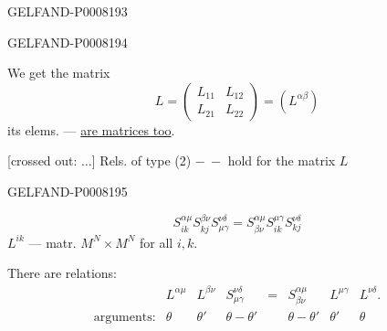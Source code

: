 \begin{GelfandAdjacentEvidence}{GELFAND-P000819}{3}


\end{GelfandAdjacentEvidence}
\begin{GelfandAdjacentEvidence}{GELFAND-P000819}{4}


We get the matrix
\begin{equation*}
L=\begin{pmatrix}L_{11}&L_{12}\\L_{21}&L_{22}\end{pmatrix}
=(L^{\alpha\beta})\tag{19}
\end{equation*}
its elems. — \uline{are matrices too}.

[crossed out: \sout{\(\ldots\)}]
Rels. of type (2) \(-\ -\) hold for the matrix \(L\)
\end{GelfandAdjacentEvidence}
\begin{GelfandAdjacentEvidence}{GELFAND-P000819}{5}


\begin{equation*}
S_{ik}^{\alpha\mu}S_{kj}^{\beta\nu}S_{\mu\gamma}^{\nu\delta}
=S_{\beta\nu}^{\alpha\mu}S_{ik}^{\mu\gamma}S_{kj}^{\nu\delta}
\tag*{(2)\('\)}
\end{equation*}
\(L^{ik}\) — matr. \(M^N\times M^N\) for all \(i,k\).

There are relations:
\begin{equation*}
\begin{array}{rccccccc}
 &L^{\alpha\mu}&L^{\beta\nu}&S_{\mu\gamma}^{\nu\delta}
 &=&S_{\beta\nu}^{\alpha\mu}&L^{\mu\gamma}&L^{\nu\delta}.\\
 \text{arguments:}&\theta&\theta'&\theta-\theta'
 &&\theta-\theta'&\theta'&\theta
\end{array}\tag{20}
\end{equation*}
\end{GelfandAdjacentEvidence}



